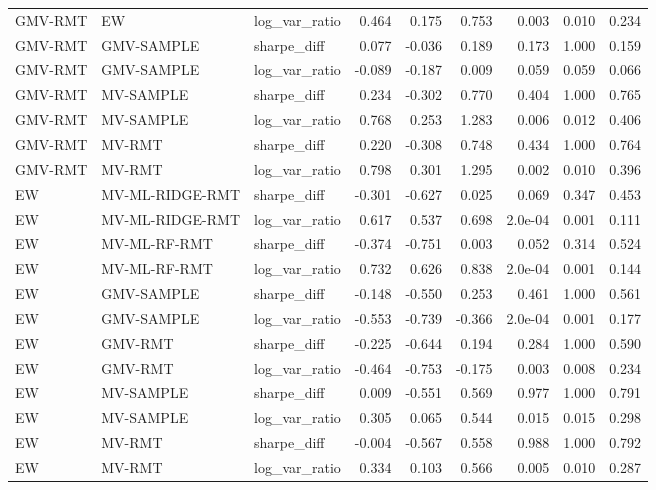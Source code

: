 \begin{table}[t]
{\begin{tabular}{lllrrrrrr}
GMV-RMT & EW & log\_var\_ratio & 0.464 & 0.175 & 0.753 & 0.003 & 0.010 & 0.234 \\
GMV-RMT & GMV-SAMPLE & sharpe\_diff & 0.077 & -0.036 & 0.189 & 0.173 & 1.000 & 0.159 \\
GMV-RMT & GMV-SAMPLE & log\_var\_ratio & -0.089 & -0.187 & 0.009 & 0.059 & 0.059 & 0.066 \\
GMV-RMT & MV-SAMPLE & sharpe\_diff & 0.234 & -0.302 & 0.770 & 0.404 & 1.000 & 0.765 \\
GMV-RMT & MV-SAMPLE & log\_var\_ratio & 0.768 & 0.253 & 1.283 & 0.006 & 0.012 & 0.406 \\
GMV-RMT & MV-RMT & sharpe\_diff & 0.220 & -0.308 & 0.748 & 0.434 & 1.000 & 0.764 \\
GMV-RMT & MV-RMT & log\_var\_ratio & 0.798 & 0.301 & 1.295 & 0.002 & 0.010 & 0.396 \\
EW & MV-ML-RIDGE-RMT & sharpe\_diff & -0.301 & -0.627 & 0.025 & 0.069 & 0.347 & 0.453 \\
EW & MV-ML-RIDGE-RMT & log\_var\_ratio & 0.617 & 0.537 & 0.698 & 2.0e-04 & 0.001 & 0.111 \\
EW & MV-ML-RF-RMT & sharpe\_diff & -0.374 & -0.751 & 0.003 & 0.052 & 0.314 & 0.524 \\
EW & MV-ML-RF-RMT & log\_var\_ratio & 0.732 & 0.626 & 0.838 & 2.0e-04 & 0.001 & 0.144 \\
EW & GMV-SAMPLE & sharpe\_diff & -0.148 & -0.550 & 0.253 & 0.461 & 1.000 & 0.561 \\
EW & GMV-SAMPLE & log\_var\_ratio & -0.553 & -0.739 & -0.366 & 2.0e-04 & 0.001 & 0.177 \\
EW & GMV-RMT & sharpe\_diff & -0.225 & -0.644 & 0.194 & 0.284 & 1.000 & 0.590 \\
EW & GMV-RMT & log\_var\_ratio & -0.464 & -0.753 & -0.175 & 0.003 & 0.008 & 0.234 \\
EW & MV-SAMPLE & sharpe\_diff & 0.009 & -0.551 & 0.569 & 0.977 & 1.000 & 0.791 \\
EW & MV-SAMPLE & log\_var\_ratio & 0.305 & 0.065 & 0.544 & 0.015 & 0.015 & 0.298 \\
EW & MV-RMT & sharpe\_diff & -0.004 & -0.567 & 0.558 & 0.988 & 1.000 & 0.792 \\
EW & MV-RMT & log\_var\_ratio & 0.334 & 0.103 & 0.566 & 0.005 & 0.010 & 0.287 \\
\bottomrule
\end{tabular}}
\end{table}
